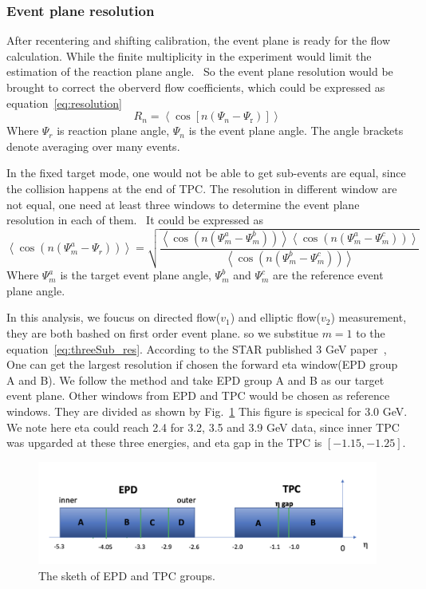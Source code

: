 \subsubsection{Event plane resolution}
After recentering and shifting calibration, the event plane is ready for the flow calculation. 
While the finite multiplicity in the experiment would limit the estimation of the reaction plane angle.~\cite{voloshin2008collective}
So the event plane resolution would be brought to correct the oberverd flow coefficients, which could be expressed as equation~\ref{eq:resolution}
\begin{equation}
R_n=\left\langle\cos \left[n\left(\Psi_n-\Psi_{\mathrm{r}}\right)\right]\right\rangle
\label{eq:resolution}
\end{equation}
Where $\Psi_r$ is reaction plane angle, $\Psi_n$ is the event plane angle.
The angle brackets denote averaging over many events. 

In the fixed target mode, one would not be able to get sub-events are equal, since the collision happens at 
the end of TPC. The resolution in different window are not equal, one need at least three windows to determine
the event plane resolution in each of them.~\cite{poskanzer1998methods} It could be expressed as
\begin{equation}
    \left\langle\cos \left(n\left(\Psi_m^a-\Psi_r\right)\right)\right\rangle=\sqrt{\frac{\left\langle\cos \left(n\left(\Psi_m^a-\Psi_m^b\right)\right)\right\rangle\left\langle\cos \left(n\left(\Psi_m^a-\Psi_m^c\right)\right)\right\rangle}{\left\langle\cos \left(n\left(\Psi_m^b-\Psi_m^c\right)\right)\right\rangle}}
\label{eq:threeSub_res}
\end{equation}
Where $\Psi_m^a$ is the target event plane angle,  $\Psi_m^b$ and  $\Psi_m^c$ are the reference event plane angle.

In this analysis, we foucus on directed flow($v_1$) and elliptic flow($v_2$) measurement, they are both bashed on 
first order event plane. so we substitue $m=1$ to the equation~\ref{eq:threeSub_res}. According to the STAR published 3 GeV paper~\cite{Abdallah_2022},
One can get the largest resolution if chosen the forward eta window(EPD group A and B). We follow the method and take EPD group A and B 
as our target event plane. Other windows from EPD and TPC would be chosen as reference windows. They are divided as shown by Fig.~\ref{fig:EPD_TPC_groups}
This figure is specical for 3.0 GeV. We note here eta could reach 2.4 for 3.2, 3.5 and 3.9 GeV data, since inner TPC was upgarded at these three energies, 
and eta gap in the TPC is $[-1.15, -1.25]$.
\begin{figure}[hbt!]
\centering
\includegraphics[width=0.65\linewidth]{figures/chapter02/EPD_TPC_groups.png}
\caption{The sketh of EPD and TPC groups.}
\label{fig:EPD_TPC_groups}
\end{figure}

